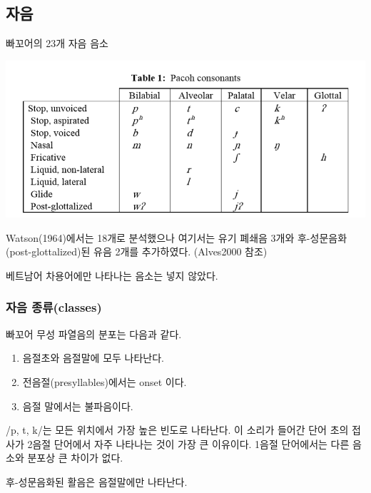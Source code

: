 \subsection{자음}
빠꼬어의 23개 자음 음소
\begin{center}
\includegraphics{Pacoh/src/Pacohconsonants.png}
\end{center}
Watson(1964)에서는 18개로 분석했으나 여기서는 유기 폐쇄음 3개와 후-성문음화(post-glottalized)된 유음 2개를 추가하였다. (Alves2000 참조)

베트남어 차용어에만 나타나는 음소는 넣지 않았다.
\subsubsection{자음 종류(classes)}
빠꼬어 무성 파열음의 분포는 다음과 같다.
\begin{enumerate}
\item 음절초와 음절말에 모두 나타난다.
\item 전음절(presyllables)에서는 onset 이다.
\item 음절 말에서는 불파음이다.
\end{enumerate}
/p, t, k/는 모든 위치에서 가장 높은 빈도로 나타난다. 이 소리가 들어간 단어 초의 접사가 2음절 단어에서 자주 나타나는 것이 가장 큰 이유이다. 1음절 단어에서는 다른 음소와 분포상 큰 차이가 없다.

후-성문음화된 활음은 음절말에만 나타난다.

